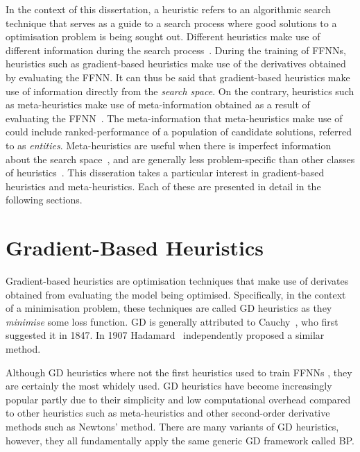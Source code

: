 In the context of this dissertation, a heuristic refers to an algorithmic search technique that serves as a guide to a search process where good solutions to a optimisation problem is being sought out. Different heuristics make use of different information during the search process~\cite{ref:kheiri:2017}. During the training of \acp{FFNN}, heuristics such as gradient-based heuristics make use of the derivatives obtained by evaluating the \acs{FFNN}. It can thus be said that gradient-based heuristics make use of information directly from the \textit{search space}. On the contrary, heuristics such as meta-heuristics make use of meta-information obtained as a result of evaluating the \acs{FFNN}~\cite{ref:blum:2003}. The meta-information that meta-heuristics make use of could include ranked-performance of a population of candidate solutions, referred to as \textit{entities}. Meta-heuristics are useful when there is imperfect information about the search space~\cite{ref:bianchi:2009}, and are generally less problem-specific than other classes of heuristics~\cite{ref:blum:2003}. This disseration takes a particular interest in gradient-based heuristics and meta-heuristics. Each of these are presented in detail in the following sections.


\section{Gradient-Based Heuristics}\label{sec:heuristics:gd}

Gradient-based heuristics are optimisation techniques that make use of derivates obtained from evaluating the model being optimised. Specifically, in the context of a minimisation problem, these techniques are called \acf{GD} heuristics as they \textit{minimise} some loss function. \Acs{GD} is generally attributed to Cauchy~\cite{ref:lemarechal:2012}, who first suggested it in 1847. In 1907 Hadamard~\cite{ref:hadamard:1908} independently proposed a similar method.

Although \acs{GD} heuristics where not the first heuristics used to train \acp{FFNN}
\cite{ref:engelbrecht:2007}, they are certainly the most whidely used. \Acs{GD} heuristics have become increasingly popular partly due to their simplicity and low computational overhead compared to other heuristics such as meta-heuristics and other second-order derivative methods such as Newtons' method. There are many variants of \acs{GD} heuristics, however, they all fundamentally apply the same generic \acs{GD} framework called \acl{BP}.

